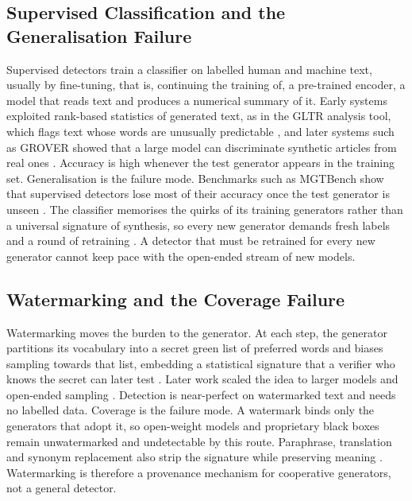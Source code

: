\documentclass[logo,msc,cs]{infthesis}      %
\begin{document}
\subsection{Supervised Classification and the Generalisation Failure}
\label{sec:supervised}
Supervised detectors train a classifier on labelled human and machine text, usually by fine-tuning, that is, continuing the training of, a pre-trained encoder, a model that reads text and produces a numerical summary of it. Early systems exploited rank-based statistics of generated text, as in the GLTR analysis tool, which flags text whose words are unusually predictable \citep{gehrmann2019gltr}, and later systems such as GROVER showed that a large model can discriminate synthetic articles from real ones \citep{zellers2019defending}. Accuracy is high whenever the test generator appears in the training set.
Generalisation is the failure mode. Benchmarks such as MGTBench show that supervised detectors lose most of their accuracy once the test generator is unseen \citep{he2024mgtbench}. The classifier memorises the quirks of its training generators rather than a universal signature of synthesis, so every new generator demands fresh labels and a round of retraining \citep{crothers2023machine, wu2025survey}. A detector that must be retrained for every new generator cannot keep pace with the open-ended stream of new models.

\newpage
\subsection{Watermarking and the Coverage Failure}
\label{sec:watermarking}
Watermarking moves the burden to the generator. At each step, the generator partitions its vocabulary into a secret green list of preferred words and biases sampling towards that list, embedding a statistical signature that a verifier who knows the secret can later test \citep{kirchenbauer2023watermark}. Later work scaled the idea to larger models and open-ended sampling \citep{dathathri2024scalable}. Detection is near-perfect on watermarked text and needs no labelled data.
Coverage is the failure mode. A watermark binds only the generators that adopt it, so open-weight models and proprietary black boxes remain unwatermarked and undetectable by this route. Paraphrase, translation and synonym replacement also strip the signature while preserving meaning \citep{kirchenbauer2023watermark}. Watermarking is therefore a provenance mechanism for cooperative generators, not a general detector.
\end{document}
